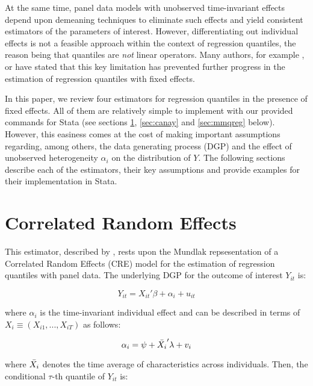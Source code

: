 \documentclass{article}
\begin{document}
At the same time, panel data models with unobserved time-invariant effects depend upon demeaning techniques to eliminate such effects and yield consistent estimators of the parameters of interest. However, differentiating out individual effects is not a feasible approach within the context of regression quantiles, the reason being that quantiles are \textit{not} linear operators. Many authors, for example \cite{abrevaya2008}, \cite{canay2011} or \cite{mss2019} have stated that this key limitation has prevented further progress in the estimation of regression quantiles with fixed effects.

In this paper, we review four estimators for regression quantiles in the presence of fixed effects. All of them are relatively simple to implement with our provided commands for Stata (see sections \ref{sec:cre}, \ref{sec:canay} and \ref{sec:mmqreg} below). However, this easiness comes at the cost of making important assumptions regarding, among others, the data generating process (DGP) and the effect of unobserved heterogeneity $\alpha_i$ on the distribution of $Y$. The following sections describe each of the estimators, their key assumptions and provide examples for their implementation in Stata. 

\section{Correlated Random Effects}\label{sec:cre}

This estimator, described by \cite{wooldridge2010}, rests upon the Mundlak repsesentation of a Correlated Random Effects (CRE) model for the estimation of regression quantiles with panel data. The underlying DGP for the outcome of interest $Y_{it}$ is:

\begin{equation}\label{eq:dgp_cre}
    Y_{it} = X_{it}' \beta + \alpha_i + u_{it}
\end{equation}

where $\alpha_i$ is the time-invariant individual effect and can be described in terms of $X_i \equiv (X_{i1},...,X_{iT})$ as follows:

\begin{equation}\label{eq:mundlak_rep}
    \alpha_i = \psi + \Bar{X_i}' \lambda + v_i
\end{equation}

where $\Bar{X_i}$ denotes the time average of characteristics across individuals. Then, the conditional $\tau$-th quantile of $Y_{it}$ is:
\end{document}
